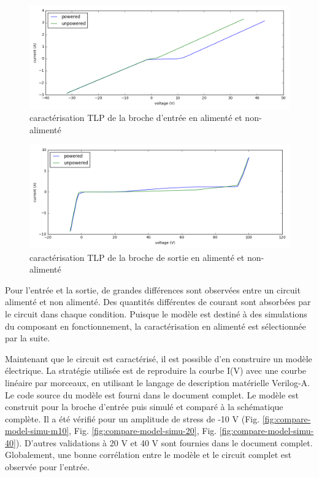 \begin{figure}[!h]
  \centering
  \includegraphics[width=\textwidth]{src/1/figures/tlp_input_characterization.png}
  \caption{caractérisation TLP de la broche d'entrée en alimenté et non-alimenté}
  \label{fig:tlp-input-cz}
\end{figure}

\begin{figure}[!h]
  \centering
  \includegraphics[width=\textwidth]{src/1/figures/tlp_output_characterization.png}
  \caption{caractérisation TLP de la broche de sortie en alimenté et non-alimenté}
  \label{fig:tlp-output-cz}
\end{figure}

Pour l'entrée et la sortie, de grandes différences sont observées entre un circuit alimenté et non alimenté.
Des quantités différentes de courant sont absorbées par le circuit dans chaque condition.
Puisque le modèle est destiné à des simulations du composant en fonctionnement, la caractérisation en alimenté est sélectionnée par la suite.

Maintenant que le circuit est caractérisé, il est possible d'en construire un modèle électrique.
La stratégie utilisée est de reproduire la courbe I(V) avec une courbe linéaire par morceaux, en utilisant le langage de description matérielle Verilog-A.
Le code source du modèle est fourni dans le document complet.
Le modèle est construit pour la broche d'entrée puis simulé et comparé à la schématique complète.
Il a été vérifié pour un amplitude de stress de -10 V (Fig. \ref{fig:compare-model-simu-m10}, Fig. \ref{fig:compare-model-simu-20}, Fig. \ref{fig:compare-model-simu-40}).
D'autres validations à 20 V et 40 V sont fournies dans le document complet.
Globalement, une bonne corrélation entre le modèle et le circuit complet est observée pour l'entrée.

